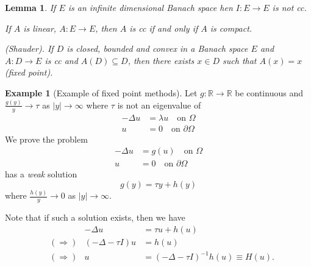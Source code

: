 \documentclass[10pt, oneside, reqno]{amsart}
\theoremstyle{plain}%
\newtheorem{lem}[thm]{Lemma}
\numberwithin{equation}{section}
\theoremstyle{definition}
\newtheorem{exmp}[thm]{Example}
\theoremstyle{remark}
\newcommand{\R}{\mathbb{R}}
\begin{document}
\begin{lem}
    If $E$ is an infinite dimensional Banach space hen $I: E \rightarrow E$ is not cc.  
    
    If $A$ is linear, $A : E \rightarrow E$, then $A$ is cc if and only if $A$ is compact.  
    
    (Shauder).  If $D$ is closed, bounded and convex in a Banach space $E$ and $A: D \rightarrow E$ is cc and $A(D) \subseteq D$, then there exists $x \in D$ such that $A(x) = x$ (fixed point).
\end{lem}

\begin{exmp}[Example of fixed point methods]
    Let $g : \R \rightarrow \R$ be continuous and $\frac{g(y)}{y} \rightarrow \tau$ as $|y| \rightarrow \infty$ where $\tau$ is not an eigenvalue of \begin{align*}
        -\Delta u &= \lambda u \quad \text{on $\Omega$} \\
        u &= 0 \quad \text{on $\partial \Omega$}
    \end{align*}  We prove the problem \begin{align*}
        -\Delta u &= g(u) \quad \text{on $\Omega$} \\
        u &= 0 \quad \text{on $\partial \Omega$}
    \end{align*} has a \emph{weak} solution \[
        g(y) = \tau y + h(y) 
    \] where $\frac{h(y)}{y} \rightarrow 0$ as $|y| \rightarrow \infty$.  
    
    Note that if such a solution exists, then we have \begin{align*}
        & &- \Delta u &= \tau u + h(u) \\
        &(\Rightarrow) &(-\Delta - \tau I) u &= h(u) \\
        &(\Rightarrow) &u &= \left(-\Delta - \tau I \right)^{-1} h(u) \equiv H(u).
    \end{align*}
\end{exmp}
\end{document}
